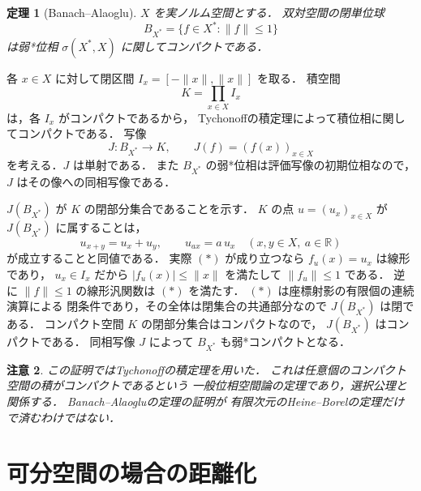 \documentclass[a5paper,10pt,onecolumn]{jsarticle}
\makeatletter
\theoremstyle{mathnotetheorem}
\newtheorem{theorem}{定理}[section]
\newtheorem{remark}[theorem]{注意}
\renewcommand{\proofname}{証明}
\renewenvironment{proof}[1][\proofname]{%
  \par\pushQED{\qed}\normalfont\topsep4\p@\@plus2\p@\relax
  \trivlist\item[\hskip\labelsep\bfseries #1]\ignorespaces
}{\popQED\endtrivlist\@endpefalse}
\newcommand{\norm}[1]{\lVert #1\rVert}
\makeatother
\begin{document}
\begin{theorem}[Banach--Alaoglu]\label{thm:alaoglu}
$X$ を実ノルム空間とする．
双対空間の閉単位球
\[
 B_{X^*}=\{f\in X^*:\norm f\le1\}
\]
は弱*位相 $\sigma(X^*,X)$ に関してコンパクトである．
\end{theorem}
\begin{proof}
各 $x\in X$ に対して閉区間
$I_x=[-\norm x,\norm x]$ を取る．
積空間
\[
 K=\prod_{x\in X}I_x
\]
は，各 $I_x$ がコンパクトであるから，
Tychonoffの積定理によって積位相に関してコンパクトである．
写像
\[
 J:B_{X^*}\to K,\qquad J(f)=(f(x))_{x\in X}
\]
を考える．$J$ は単射である．
また $B_{X^*}$ の弱*位相は評価写像の初期位相なので，
$J$ はその像への同相写像である．

$J(B_{X^*})$ が $K$ の閉部分集合であることを示す．
$K$ の点 $u=(u_x)_{x\in X}$ が $J(B_{X^*})$ に属することは，
\[
 u_{x+y}=u_x+u_y,\qquad
 u_{ax}=a\,u_x
 \quad(x,y\in X,\ a\in\mathbb R)
 \tag{$*$}
\]
が成立することと同値である．
実際 $(*)$ が成り立つなら $f_u(x)=u_x$ は線形であり，
$u_x\in I_x$ だから
$|f_u(x)|\le\norm x$ を満たして $\norm{f_u}\le1$ である．
逆に $\norm f\le1$ の線形汎関数は $(*)$ を満たす．
$(*)$ は座標射影の有限個の連続演算による
閉条件であり，その全体は閉集合の共通部分なので
$J(B_{X^*})$ は閉である．
コンパクト空間 $K$ の閉部分集合はコンパクトなので，
$J(B_{X^*})$ はコンパクトである．
同相写像 $J$ によって $B_{X^*}$ も弱*コンパクトとなる．
\end{proof}

\begin{remark}
この証明ではTychonoffの積定理を用いた．
これは任意個のコンパクト空間の積がコンパクトであるという
一般位相空間論の定理であり，選択公理と関係する．
Banach--Alaogluの定理の証明が
有限次元のHeine--Borelの定理だけで済むわけではない．
\end{remark}

\section{可分空間の場合の距離化}
\end{document}
